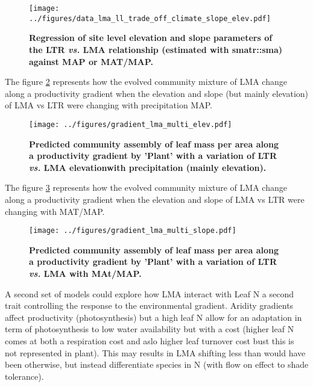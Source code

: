 \documentclass[a4paper,11pt]{article}
\begin{document}
\begin{figure}[ht]
\centering
\texttt{[image: ../figures/data\_lma\_ll\_trade\_off\_climate\_slope\_elev.pdf]}
\caption{\textbf{Regression of site level elevation and slope parameters of the LTR \textit{vs.} LMA relationship (estimated with smatr::sma) against MAP or MAT/MAP. }
\label{fig:elev_slope}}
\end{figure}



\clearpage

The figure \ref{fig:lma_map} represents how the evolved community mixture of LMA change along a productivity gradient when the elevation and slope (but mainly elevation) of LMA vs LTR were changing with precipitation MAP.

\begin{figure}[ht]
\centering
\texttt{[image: ../figures/gradient\_lma\_multi\_elev.pdf]}
\caption{\textbf{Predicted community assembly of leaf mass per area along a productivity gradient by 'Plant' with a variation of LTR \textit{vs.} LMA elevationwith precipitation (mainly elevation).}
\label{fig:lma_map}}
\end{figure}

The figure \ref{fig:lma_mat_o_map} represents how the evolved community mixture of LMA change along a productivity gradient when the elevation and slope of LMA vs LTR were changing with MAT/MAP.

\begin{figure}[ht]
\centering
\texttt{[image: ../figures/gradient\_lma\_multi\_slope.pdf]}
\caption{\textbf{Predicted community assembly of leaf mass per area along a productivity gradient by 'Plant' with a variation of LTR \textit{vs.} LMA with MAt/MAP.}
\label{fig:lma_mat_o_map}}
\end{figure}


\clearpage

A second set of models could explore how LMA interact with Leaf N a second trait controlling the response to the environmental gradient. Aridity gradients affect productivity (photosynthesis) but a
high leaf N allow for an adaptation in term of photosynthesis to low water availability but with a cost (higher leaf N comes at both a respiration cost and aslo higher leaf turnover cost bust this is not represented in plant). This may results in LMA shifting less than would have been otherwise, but instead differentiate species in N (with flow on effect to shade tolerance).
\end{document}
